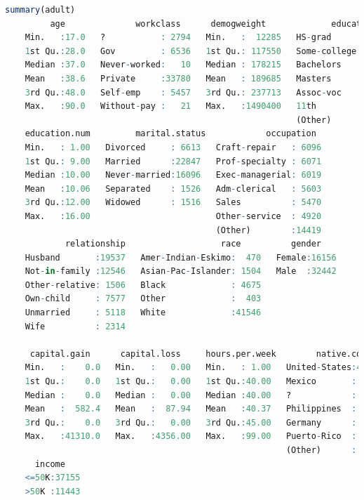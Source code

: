 \documentclass[
  11pt,
]{book}
\theoremstyle{definition}
\theoremstyle{definition}
\theoremstyle{definition}
\theoremstyle{definition}
\theoremstyle{remark}
\begin{document}
\begin{lstlisting}[language=R]
summary(adult)
         age              workclass      demogweight             education    
    Min.   :17.0   ?           : 2794   Min.   :  12285   HS-grad     :15750  
    1st Qu.:28.0   Gov         : 6536   1st Qu.: 117550   Some-college:10860  
    Median :37.0   Never-worked:   10   Median : 178215   Bachelors   : 7962  
    Mean   :38.6   Private     :33780   Mean   : 189685   Masters     : 2627  
    3rd Qu.:48.0   Self-emp    : 5457   3rd Qu.: 237713   Assoc-voc   : 2058  
    Max.   :90.0   Without-pay :   21   Max.   :1490400   11th        : 1812  
                                                          (Other)     : 7529  
    education.num         marital.status            occupation   
    Min.   : 1.00   Divorced     : 6613   Craft-repair   : 6096  
    1st Qu.: 9.00   Married      :22847   Prof-specialty : 6071  
    Median :10.00   Never-married:16096   Exec-managerial: 6019  
    Mean   :10.06   Separated    : 1526   Adm-clerical   : 5603  
    3rd Qu.:12.00   Widowed      : 1516   Sales          : 5470  
    Max.   :16.00                         Other-service  : 4920  
                                          (Other)        :14419  
            relationship                   race          gender     
    Husband       :19537   Amer-Indian-Eskimo:  470   Female:16156  
    Not-in-family :12546   Asian-Pac-Islander: 1504   Male  :32442  
    Other-relative: 1506   Black             : 4675                 
    Own-child     : 7577   Other             :  403                 
    Unmarried     : 5118   White             :41546                 
    Wife          : 2314                                            
                                                                    
     capital.gain      capital.loss     hours.per.week        native.country 
    Min.   :    0.0   Min.   :   0.00   Min.   : 1.00   United-States:43613  
    1st Qu.:    0.0   1st Qu.:   0.00   1st Qu.:40.00   Mexico       :  949  
    Median :    0.0   Median :   0.00   Median :40.00   ?            :  847  
    Mean   :  582.4   Mean   :  87.94   Mean   :40.37   Philippines  :  292  
    3rd Qu.:    0.0   3rd Qu.:   0.00   3rd Qu.:45.00   Germany      :  206  
    Max.   :41310.0   Max.   :4356.00   Max.   :99.00   Puerto-Rico  :  184  
                                                        (Other)      : 2507  
      income     
    <=50K:37155  
    >50K :11443  
                 
                 
                 
                 
   
\end{lstlisting}
\end{document}
